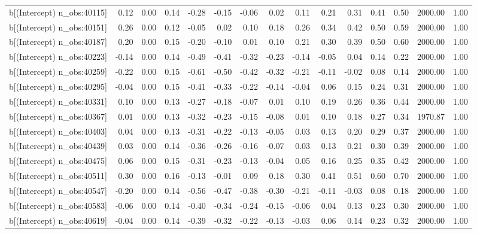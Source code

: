 \begin{table}[ht]
\begin{tabular}{rrrrrrrrrrrrrrr}
  b[(Intercept) n\_obs:40115] & 0.12 & 0.00 & 0.14 & -0.28 & -0.15 & -0.06 & 0.02 & 0.11 & 0.21 & 0.31 & 0.41 & 0.50 & 2000.00 & 1.00 \\ 
  b[(Intercept) n\_obs:40151] & 0.26 & 0.00 & 0.12 & -0.05 & 0.02 & 0.10 & 0.18 & 0.26 & 0.34 & 0.42 & 0.50 & 0.59 & 2000.00 & 1.00 \\ 
  b[(Intercept) n\_obs:40187] & 0.20 & 0.00 & 0.15 & -0.20 & -0.10 & 0.01 & 0.10 & 0.21 & 0.30 & 0.39 & 0.50 & 0.60 & 2000.00 & 1.00 \\ 
  b[(Intercept) n\_obs:40223] & -0.14 & 0.00 & 0.14 & -0.49 & -0.41 & -0.32 & -0.23 & -0.14 & -0.05 & 0.04 & 0.14 & 0.22 & 2000.00 & 1.00 \\ 
  b[(Intercept) n\_obs:40259] & -0.22 & 0.00 & 0.15 & -0.61 & -0.50 & -0.42 & -0.32 & -0.21 & -0.11 & -0.02 & 0.08 & 0.14 & 2000.00 & 1.00 \\ 
  b[(Intercept) n\_obs:40295] & -0.04 & 0.00 & 0.15 & -0.41 & -0.33 & -0.22 & -0.14 & -0.04 & 0.06 & 0.15 & 0.24 & 0.31 & 2000.00 & 1.00 \\ 
  b[(Intercept) n\_obs:40331] & 0.10 & 0.00 & 0.13 & -0.27 & -0.18 & -0.07 & 0.01 & 0.10 & 0.19 & 0.26 & 0.36 & 0.44 & 2000.00 & 1.00 \\ 
  b[(Intercept) n\_obs:40367] & 0.01 & 0.00 & 0.13 & -0.32 & -0.23 & -0.15 & -0.08 & 0.01 & 0.10 & 0.18 & 0.27 & 0.34 & 1970.87 & 1.00 \\ 
  b[(Intercept) n\_obs:40403] & 0.04 & 0.00 & 0.13 & -0.31 & -0.22 & -0.13 & -0.05 & 0.03 & 0.13 & 0.20 & 0.29 & 0.37 & 2000.00 & 1.00 \\ 
  b[(Intercept) n\_obs:40439] & 0.03 & 0.00 & 0.14 & -0.36 & -0.26 & -0.16 & -0.07 & 0.03 & 0.13 & 0.21 & 0.30 & 0.39 & 2000.00 & 1.00 \\ 
  b[(Intercept) n\_obs:40475] & 0.06 & 0.00 & 0.15 & -0.31 & -0.23 & -0.13 & -0.04 & 0.05 & 0.16 & 0.25 & 0.35 & 0.42 & 2000.00 & 1.00 \\ 
  b[(Intercept) n\_obs:40511] & 0.30 & 0.00 & 0.16 & -0.13 & -0.01 & 0.09 & 0.18 & 0.30 & 0.41 & 0.51 & 0.60 & 0.70 & 2000.00 & 1.00 \\ 
  b[(Intercept) n\_obs:40547] & -0.20 & 0.00 & 0.14 & -0.56 & -0.47 & -0.38 & -0.30 & -0.21 & -0.11 & -0.03 & 0.08 & 0.18 & 2000.00 & 1.00 \\ 
  b[(Intercept) n\_obs:40583] & -0.06 & 0.00 & 0.14 & -0.40 & -0.34 & -0.24 & -0.15 & -0.06 & 0.04 & 0.13 & 0.23 & 0.30 & 2000.00 & 1.00 \\ 
  b[(Intercept) n\_obs:40619] & -0.04 & 0.00 & 0.14 & -0.39 & -0.32 & -0.22 & -0.13 & -0.03 & 0.06 & 0.14 & 0.23 & 0.32 & 2000.00 & 1.00 \\ 

\end{tabular}
\end{table}
